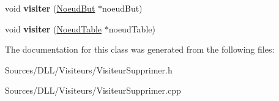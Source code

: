 \begin{DoxyCompactItemize}
\item 
void {\bfseries visiter} (\hyperlink{class_noeud_but}{Noeud\+But} $\ast$noeud\+But)\hypertarget{class_visiteur_supprimer_a683159def48d2baed3d71ec99ae127c2}{}\label{class_visiteur_supprimer_a683159def48d2baed3d71ec99ae127c2}

\item 
void {\bfseries visiter} (\hyperlink{class_noeud_table}{Noeud\+Table} $\ast$noeud\+Table)\hypertarget{class_visiteur_supprimer_aef5fe7b38f99dd605cc1f7a5826c9066}{}\label{class_visiteur_supprimer_aef5fe7b38f99dd605cc1f7a5826c9066}

\end{DoxyCompactItemize}


The documentation for this class was generated from the following files\+:\begin{DoxyCompactItemize}
\item 
Sources/\+D\+L\+L/\+Visiteurs/Visiteur\+Supprimer.\+h\item 
Sources/\+D\+L\+L/\+Visiteurs/Visiteur\+Supprimer.\+cpp\end{DoxyCompactItemize}
